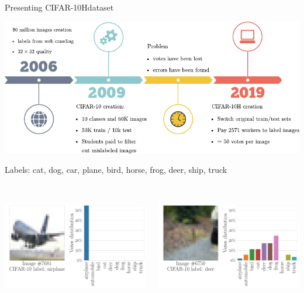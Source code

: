 \begin{frame}{Presenting CIFAR-10Hdataset}{}
    \begin{center}
    \includegraphics[width=.75\textwidth]{./images/cifar-10h_creation.pdf}
    \end{center}
    Labels: cat, dog, car, plane, bird, horse, frog, deer, ship, truck
    \pause
    \begin{columns}
        \begin{column}{.3\textwidth}
            \    \includegraphics[width=\textwidth]{../chapters/images/image_n_hist7681_paper.pdf}
        \end{column}
        \begin{column}{.3\textwidth}
            \    \includegraphics[width=\textwidth]{../chapters/images/image_n_hist6750_paper.pdf}


\end{column}
\end{columns}
\end{frame}
